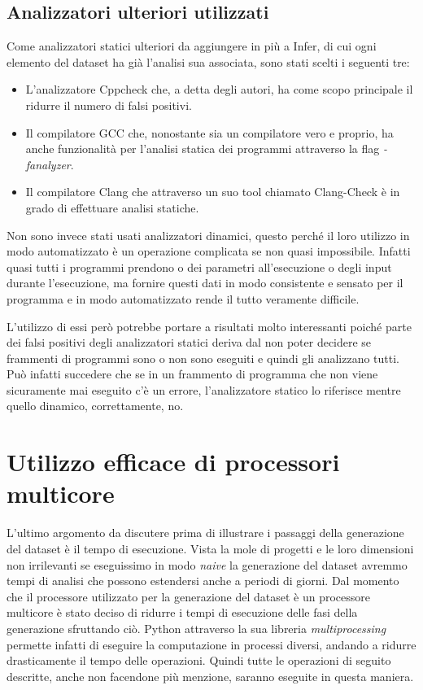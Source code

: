 \subsection{Analizzatori ulteriori utilizzati}
Come analizzatori statici ulteriori da aggiungere in più a Infer, di cui ogni elemento del dataset ha già l'analisi sua associata, sono stati scelti i seguenti tre:
    \begin{itemize}
        \item L'analizzatore Cppcheck che, a detta degli autori, ha come scopo principale il ridurre il numero di falsi positivi.
        \item Il compilatore GCC che, nonostante sia un compilatore vero e proprio, ha anche funzionalità per l'analisi statica dei programmi attraverso la flag \textit{-fanalyzer}.
        \item Il compilatore Clang che attraverso un suo tool chiamato Clang-Check è in grado di effettuare analisi statiche.
    \end{itemize}
Non sono invece stati usati analizzatori dinamici, questo perché il loro utilizzo in modo automatizzato è un operazione complicata se non quasi impossibile. 
Infatti quasi tutti i programmi prendono o dei parametri all'esecuzione o degli input durante l'esecuzione, ma fornire questi dati in modo consistente e sensato per il programma e in modo automatizzato rende il tutto veramente difficile.

L'utilizzo di essi però potrebbe portare a risultati molto interessanti poiché parte dei falsi positivi degli analizzatori statici deriva dal non poter decidere se frammenti di programmi sono o non sono eseguiti e quindi gli analizzano tutti.
Può infatti succedere che se in un frammento di programma che non viene sicuramente mai eseguito c'è un errore, l'analizzatore statico lo riferisce mentre quello dinamico, correttamente, no.


\section{Utilizzo efficace di processori multicore}
L'ultimo argomento da discutere prima di illustrare i passaggi della generazione del dataset è il tempo di esecuzione. 
Vista la mole di progetti e le loro dimensioni non irrilevanti se eseguissimo in modo \textit{naive} la generazione del dataset avremmo tempi di analisi che possono estendersi anche a periodi di giorni.
Dal momento che il processore utilizzato per la generazione del dataset è un processore multicore è stato deciso di ridurre i tempi di esecuzione delle fasi della generazione sfruttando ciò.
Python attraverso la sua libreria \textit{multiprocessing} permette infatti di eseguire la computazione in processi diversi, andando a ridurre drasticamente il tempo delle operazioni.
Quindi tutte le operazioni di seguito descritte, anche non facendone più menzione, saranno eseguite in questa maniera.

